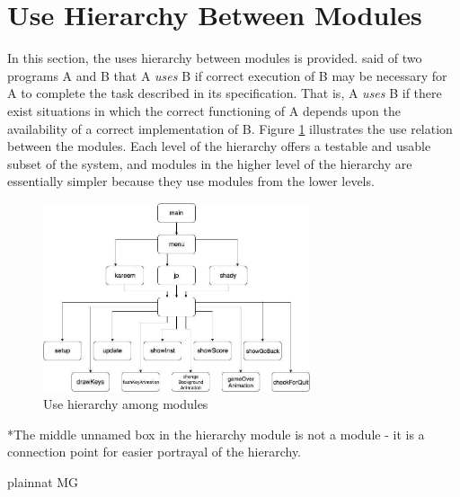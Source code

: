 \documentclass[12pt, titlepage]{article}
\begin{document}
\section{Use Hierarchy Between Modules} \label{SecUse}
In this section, the uses hierarchy between modules is
provided. \citet{Parnas1978} said of two programs A and B that A {\em uses} B if
correct execution of B may be necessary for A to complete the task described in
its specification. That is, A {\em uses} B if there exist situations in which
the correct functioning of A depends upon the availability of a correct
implementation of B.  Figure \ref{FigUH} illustrates the use relation between
the modules. Each level of the hierarchy offers a testable and usable subset of the
system, and modules in the higher level of the hierarchy are essentially simpler
because they use modules from the lower levels.
\begin{figure}[H]
\centering
\includegraphics[width=0.7\textwidth]{UsesHierarchy.png}
\caption{Use hierarchy among modules}
\label{FigUH}
\end{figure}
*The middle unnamed box in the hierarchy module is not a module - it is a connection point for easier portrayal of the hierarchy.

 {plainnat}
 {MG}
\end{document}
